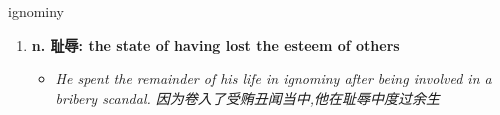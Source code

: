 
\begin{frame}
{\huge ignominy}
\begin{center}
\begin{enumerate}\Large
  \item \textbf{n. 耻辱: the state of having lost the esteem of others}
  \begin{itemize}
    \item \em{\Large{He spent the remainder of his life in ignominy after being involved in a bribery scandal. 因为卷入了受贿丑闻当中,他在耻辱中度过余生}}
  \end{itemize}
\end{enumerate}
\end{center}
\end{frame}
